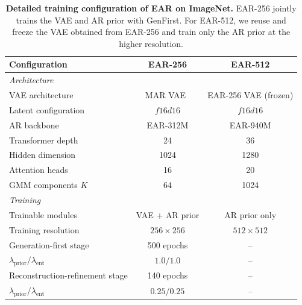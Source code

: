 \begin{table}[t]
\centering
\caption{
\textbf{Detailed training configuration of EAR on ImageNet.}
EAR-256 jointly trains the VAE and AR prior with GenFirst.
For EAR-512, we reuse and freeze the VAE obtained from EAR-256 and train only
the AR prior at the higher resolution.
}
\label{tab:ear_details}
\scriptsize
\setlength{\tabcolsep}{5pt}
\renewcommand{\arraystretch}{1.10}

\begin{tabular}{lcc}
\toprule
\textbf{Configuration}
& \textbf{EAR-256}
& \textbf{EAR-512} \\
\midrule

\multicolumn{3}{l}{\textit{Architecture}} \\
\midrule
VAE architecture
& MAR VAE~\cite{mar}
& EAR-256 VAE (frozen) \\

Latent configuration
& $f16d16$
& $f16d16$ \\

AR backbone
& EAR-312M
& EAR-940M \\

Transformer depth
& 24
& 36 \\

Hidden dimension
& 1024
& 1280 \\

Attention heads
& 16
& 20 \\

GMM components $K$
& 64
& 1024 \\

\midrule
\multicolumn{3}{l}{\textit{Training}} \\
\midrule

Trainable modules
& VAE + AR prior
& AR prior only \\

Training resolution
& $256\times256$
& $512\times512$ \\

Generation-first stage
& 500 epochs
& -- \\

$\lambda_{\mathrm{prior}} / \lambda_{\mathrm{ent}}$
& $1.0 / 1.0$
& -- \\

Reconstruction-refinement stage
& 140 epochs
& -- \\

$\lambda_{\mathrm{prior}} / \lambda_{\mathrm{ent}}$
& $0.25 / 0.25$
& -- \\


\end{tabular}
\end{table}

